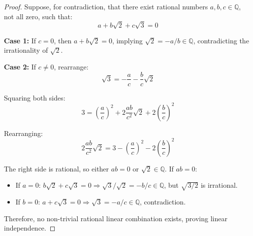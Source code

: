 \documentclass[12pt,a4paper,oneside]{article}
\begin{document}
\begin{proof}
Suppose, for contradiction, that there exist rational numbers $a, b, c \in \mathbb{Q}$, not all zero, such that:
\begin{equation}
    a + b\sqrt{2} + c\sqrt{3} = 0
\end{equation}

\textbf{Case 1:} If $c = 0$, then $a + b\sqrt{2} = 0$, implying $\sqrt{2} = -a/b \in \mathbb{Q}$, contradicting the irrationality of $\sqrt{2}$.

\textbf{Case 2:} If $c \neq 0$, rearrange:
\begin{equation}
    \sqrt{3} = -\frac{a}{c} - \frac{b}{c}\sqrt{2}
\end{equation}

Squaring both sides:
\begin{equation}
    3 = \left(\frac{a}{c}\right)^2 + 2\frac{ab}{c^2}\sqrt{2} + 2\left(\frac{b}{c}\right)^2
\end{equation}

Rearranging:
\begin{equation}
    2\frac{ab}{c^2}\sqrt{2} = 3 - \left(\frac{a}{c}\right)^2 - 2\left(\frac{b}{c}\right)^2
\end{equation}

The right side is rational, so either $ab = 0$ or $\sqrt{2} \in \mathbb{Q}$. If $ab = 0$:
\begin{itemize}
    \item If $a = 0$: $b\sqrt{2} + c\sqrt{3} = 0 \Rightarrow \sqrt{3}/\sqrt{2} = -b/c \in \mathbb{Q}$, but $\sqrt{3/2}$ is irrational.
    \item If $b = 0$: $a + c\sqrt{3} = 0 \Rightarrow \sqrt{3} = -a/c \in \mathbb{Q}$, contradiction.
\end{itemize}

Therefore, no non-trivial rational linear combination exists, proving linear independence.
\end{proof}
\end{document}
